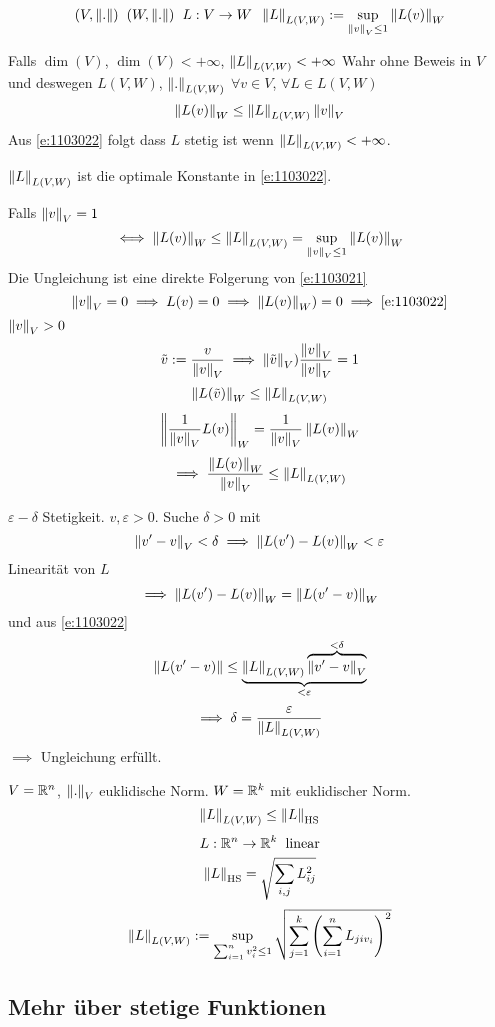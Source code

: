\begin{equation}
  \label{e:1103021}
  (V,\left\| . \right\|)\hspace{2mm} (W,\left\| . \right\|)\hspace{2mm} L:V\rightarrow W\hspace{2mm}\left\| L \right\|_{L(V,W)}:=\sup_{\left\| v \right\|_V\leq 1}\left\| L(v) \right\|_W
\end{equation}
\begin{Sat}
  Falls $\dim(V)$, $\dim(V)< +\infty$, $\left\| L \right\|_{L(V,W)}< + \infty$ Wahr ohne Beweis in $V$ und deswegen $L(V,W)$, $\left\| . \right\|_{L(V,W)}$ $\forall v\in V$, $\forall L\in L(V,W)$
  \begin{equation}
    \label{e:1103022}
    \left\| L(v) \right\|_W\leq\left\| L \right\|_{L(V,W)}\left\| v \right\|_V
  \end{equation}
  Aus \ref{e:1103022} folgt dass $L$ stetig ist wenn $\left\| L \right\|_{L(V,W)}< +\infty$.
\end{Sat}
\begin{Bem}
  $\left\| L \right\|_{L(V,W)}$ ist die optimale Konstante in \ref{e:1103022}.
\end{Bem}
\begin{Bew}
  Falls $\left\| v \right\|_V=1$
  \[\iff \left\| L(v) \right\|_W\leq \left\| L \right\|_{L(V,W)}=\sup_{\left\| v \right\|_V\leq 1}\left\| L(v) \right\|_W\]
  Die Ungleichung ist eine direkte Folgerung von \ref{e:1103021}
  \[\left\| v \right\|_V=0\implies L(v)=0\implies\left\| L(v) \right\|_W)=0\implies\ref{e:1103022}\]
  $\left\| v \right\|_V>0$
  \[\tilde v:=\frac{v}{\left\| v \right\|_V}\implies\left\| \tilde v \right\|_V)\frac{\left\| v \right\|_V}{\left\| v \right\|_V}=1\]
  \[\left\| L(\tilde v) \right\|_W\leq \left\| L \right\|_{L(V,W)}\]
  \[\left\| \frac{1}{\left\| v \right\|_V}L(v) \right\|_W=\frac{1}{\left\| v \right\|_V}\left\| L(v) \right\|_W\]
  \[\implies\frac{\left\| L(v) \right\|_W}{\left\| v \right\|_V}\leq \left\| L \right\|_{L(V,W)}\]
\end{Bew}
\begin{Bew}
  $\varepsilon-\delta$ Stetigkeit. $v,\varepsilon>0$. Suche $\delta>0$ mit
  \[\left\| v'-v \right\|_V<\delta\implies\left\| L(v')-L(v) \right\|_W<\varepsilon\]
  Linearität von $L$
  \[\implies \left\| L(v')-L(v) \right\|_W=\left\| L(v'-v) \right\|_W\]
  und aus \ref{e:1103022}
  \[\left\| L(v'-v) \right\|\leq\underbrace{\left\| L \right\|_{L(V,W)}\overbrace{\left\| v'-v \right\|_V}^{<\delta}}_{<\varepsilon}\]
  \[\implies \delta=\frac{\varepsilon}{\left\| L \right\|_{L(V,W)}}\]
  $\implies$ Ungleichung erfüllt.
\end{Bew}
\begin{Bem}
  $V=\mathbb{R}^n$, $\left\| . \right\|_V$ euklidische Norm. $W=\mathbb{R}^k$ mit euklidischer Norm.
  \[\left\| L \right\|_{L(V,W)}\leq \left\| L \right\|_{\text{HS}}\]
  \[L:\mathbb{R}^n\rightarrow\mathbb{R}^k\hspace{2mm}\text{linear}\]
  \[\left\| L \right\|_\text{HS}=\sqrt{\sum_{i,j}L_{ij}^2}\]
  \[\left\| L \right\|_{L(V,W)}:=\sup_{\sum^n_{i=1}v_i^2\leq 1}\sqrt{\sum^k_{j=1}\left( \sum_{i=1}^nL_{jiv_i} \right)^2}\]
\end{Bem}
\subsection{Mehr über stetige Funktionen}
